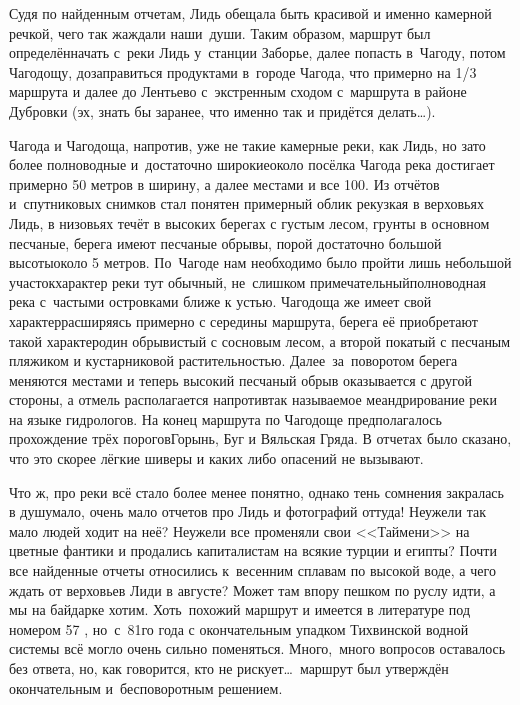Судя по найденным отчетам, Лидь обещала быть красивой и именно камерной речкой, чего так жаждали наши~души. Таким образом, маршрут был определён\mdash начать с~реки Лидь у~станции Заборье, далее попасть в~Чагоду, потом Чагодощу, дозаправиться продуктами в~городе Чагода, что примерно на 1/3 маршрута и далее до Лентьево с~экстренным сходом с~маршрута в районе Дубровки (эх, знать бы заранее, что именно так и придётся делать\ldots).
 
Чагода и Чагодоща, напротив, уже не такие камерные реки, как Лидь, но зато более полноводные и~достаточно широкие\mdash около посёлка Чагода река достигает примерно 50 метров в ширину, а далее местами и все 100. Из отчётов и~спутниковых снимков стал понятен примерный облик рек\mdash узкая в верховьях Лидь, в низовьях течёт в высоких берегах с густым лесом, грунты в основном песчаные, берега имеют песчаные обрывы, порой достаточно большой высоты\mdash около 5 метров. По~Чагоде нам необходимо было пройти лишь небольшой участок\mdash характер реки тут обычный, не~слишком примечательный\mdash полноводная река с~частыми островками ближе к устью. Чагодоща же имеет свой характер\mdash расширяясь примерно с середины маршрута, берега её приобретают такой характер\mdash один обрывистый с сосновым лесом, а второй покатый с песчаным пляжиком и кустарниковой растительностью. Далее~за~поворотом берега меняются местами и теперь высокий песчаный обрыв оказывается с другой стороны, а отмель располагается напротив\mdash так называемое меандрирование реки на языке гидрологов. На конец маршрута по Чагодоще предполагалось прохождение трёх порогов\mdash Горынь, Буг и Вяльская Гряда. В отчетах было сказано, что это скорее лёгкие шиверы и каких либо опасений не вызывают. 

Что ж, про реки всё стало более менее понятно, однако тень сомнения закралась в душу\mdash мало, очень мало отчетов про Лидь и фотографий оттуда! Неужели так мало людей ходит на неё? Неужели все променяли свои <<Таймени>> на цветные фантики и продались капиталистам на всякие турции и египты? Почти все найденные отчеты относились к~весенним сплавам по высокой воде, а чего ждать от верховьев Лиди в августе? Может там впору пешком по руслу идти, а мы на байдарке хотим. Хоть~похожий маршрут и имеется в литературе под номером 57 \cite{Рыжавский}, но~с~81\sdash го года с окончательным упадком Тихвинской водной системы всё могло очень сильно поменяться. Много,~много вопросов оставалось без ответа, но, как говорится, кто не рискует\ldots~маршрут был утверждён окончательным и~бесповоротным решением.

